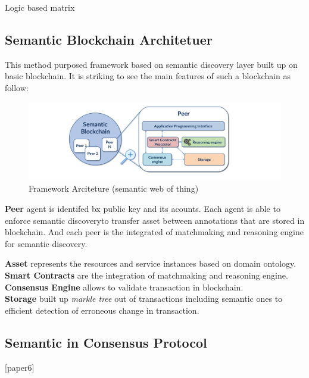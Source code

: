  Logic based matrix 
 \subsection{Semantic Blockchain Architetuer} 
 This method purposed framework based on semantic discovery layer built up on basic blockchain. It is striking to see the main features of such a blockchain as follow:
 
  \begin{center}
 	\begin{figure}[htb!]
 		
 		\begin{minipage}{0.55\linewidth}
 			\centering
 			\includegraphics[width=1.95\textwidth]{images/chap02_PeerBlockchain.png}
 		\end{minipage}
 		\caption[Framework Arciteture]{Framework Arciteture (semantic web of thing)}
 		
 	\end{figure}
 	
 \end{center}
 
 
  \textbf{Peer} agent is identifed bx public key and its acounts. Each agent is able to enforce semantic discoveryto transfer asset between annotations that are stored in blockchain. And each peer is the integrated of matchmaking and reasoning engine for semantic discovery.
 
 \textbf{Asset} represents the resources and service instances based on domain ontology.\\
 \textbf{Smart Contracts} are the integration of matchmaking and reasoning engine.\\
 \textbf{Consensus Engine} allows to validate transaction in blockchain.\\
 \textbf{Storage} built up  \textit{markle tree} out of transactions including semantic ones to efficient detection of erroneous change in transaction.
 
 \subsection{Semantic in Consensus Protocol}[paper6]

